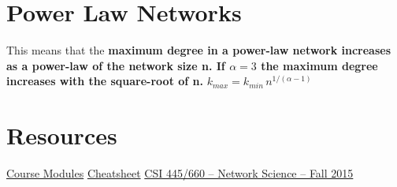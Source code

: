 \documentclass{article}
\begin{document}
\section{Power Law Networks}
This means that the \textbf{maximum degree in a power-law network increases as a power-law of the network size n. If $\alpha=3$ the maximum degree increases with the square-root of n.} 
$k_{max} = k_{min} \, n^{1/(\alpha-1)}$
\section{Resources}
\href{https://gatech.instructure.com/courses/433540/modules}{Course Modules}
\href{https://cazabetremy.fr/Teaching/CN2021/CheatSheet/CN_CS_introduction.pdf}{Cheatsheet}
\href{https://www.albany.edu/~ravi/pdfs/sol_hw2.pdf}{CSI 445/660 – Network Science – Fall 2015}
\end{document}
